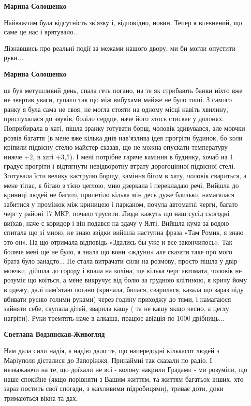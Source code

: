 \begin{itemize} %
\textbf{Марина Солошенко} 

Найважчим була відсутність зв'язку і, відповідно, новин. Тепер я впевнений, що
саме це нас і врятувало...

Дізнавшись про реальні події за межами нашого двору, ми би могли опустити руки...

\textbf{Марина Солошенко} 

це був метушливий день, спала геть погано, на те як стрибають банки ніхто вже
не звертав уваги, гупало так що між вибухами майже не було тиші. З самого ранку
я була сама не своя, не могла стояти на одному місці навіть хвилину,
прислухалася до звуків, боліло сердце, наче його хтось стискає у долонях.
Поприбирала в хаті, пішла зранку готувати борщ, чоловік здивувався, але мовчки
розвів багаття (в мене вже кілька днів нав'язлива ідея прогріти будинок, бо
коли кріпили підвісну стелю майстер сказав, що не можна опускати температуру
нижче +2, в хаті +3,5). І мені потрібне гаряче каміння в будинку, хочаб на 1
градус прогріти і відтягнути невідворотну втрату дорогоцінної підвісної стелі.
Зготувала їсти велику каструлю борщу, каміння бігом в хату, чоловік свариться,
а мене тіпає, я бігаю з тією цеглою, мию дзеркала і перекладаю речі. Вийшла до
криниці людей не багато, прилетіло кілька мін десь дуже близько, намагалася
забитися у проміжок між криницею і парканом, почула автоматні черги, багато
черг у районі 17 МКР, почало трусити. Люди кажуть що наш сусід сьогодні виїхав,
наче є коридор і він подався на здачу у Ялті. Вийшла кума за водою спитала що
зі мною, не знаю звідки вийшла наступна фраза «Там Ромик, я знаю это он». На що
отримала відповідь «Здались бы уже и все закончилось». Так боляче мені ще не
було, я знала що вони «ждуни» але сказати таке про мого брата було занадто... Не
стала витрачати сили на розмову, просто пішла у двір мовчки, дійшла до городу і
впала на коліна, ще кілька черг автомата, чоловік не розуміє що коїться, а мене
викручує від болю за грудною клітиною, я кричу йому в одежу, далі пам'ятаю
погано (кричала, билася, сварилася, казала що зараз піду вбивати русню голими
руками) через годину приходжу до тями, і намагаюся зайняти себе, скупала дітей,
зварила кашу ( та не кашу якщо чесно, а цеглу нагріти). Руки тремтять наче в
алкаша, працює авіація по 1000 дрібниць...

\textbf{Светлана Водзянская-Живогляд} 

Нам дала сили надія, а надію дало те, що напередодні кількасот людей з
Маріуполя дісталися до Запоріжжя. Принаймні так сказали по радіо. І незважаючи
на те, що доїхали не всі - колону накрили Градами - ми розуміли, що наше
спокійне (якщо порівняти з Вашим життям, та життям багатьох інших, хто зараз
постить свої спогади, з жахливими підробицями), триває доти, доки тримаються
вікна та дах.


\end{itemize}
